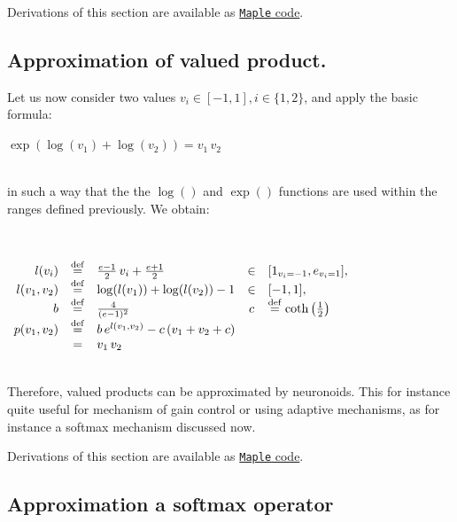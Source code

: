 \documentclass[a4]{article} \usepackage[left=2cm,right=3cm,top=1cm,bottom=2cm]{geometry}
\newcommand{\eqline}[1]{~\vspace{0.1cm}\\\centerline{$#1$}\vspace{0.1cm}\\}
\newcommand{\defq}{\stackrel {\rm def}{=}}
\begin{document}
Derivations of this section are available as \href{https://raw.githubusercontent.com/vthierry/braincraft/master/doc/tex/explog.mpl.out.txt}{{\tt Maple} code}.

\subsection{Approximation of valued product.}

Let us now consider two values $v_i \in [-1, 1], i \in \{1, 2\}$, and apply the basic formula:
\eqline{\exp(\log(v_1)+\log(v_2)) = v_1 \, v_2}
in such a way that the the $\log()$ and $\exp()$ functions are used within the ranges defined previously. We obtain:

\eqline{\begin{array}{rclcl}
    l(v_i) &\defq& \frac{e-1}{2} \, v_i + \frac{e+1}{2} &\in& [1_{v_i = -1}, e_{v_i = 1}], \\
    l(v_1, v_2) &\defq& \log(l(v_1)) + \log(l(v_2)) -1 &\in& [-1, 1] , \\
    b &\defq& \frac{4}{(e -1)^2}  &c& \defq \mbox{coth}\left(\frac{1}{2}\right) \\
    p(v_1, v_2) &\defq& b \, e^{l(v_1, v_2)} - c \, (v_1 + v_2 + c) \\
    &=& v_1 \, v_2
\end{array}}

Therefore,  valued products can be approximated by neuronoids. This for instance quite useful for mechanism of gain control or using adaptive mechanisms, as for instance a softmax mechanism discussed now.
    
Derivations of this section are available as \href{https://raw.githubusercontent.com/vthierry/braincraft/master/doc/tex/explog.mpl.out.txt}{{\tt Maple} code}.

\subsection{Approximation a softmax operator}
\end{document}
